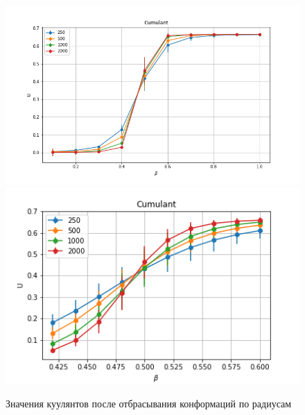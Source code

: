 \begin{figure}[h]
	\centering
	\includegraphics[width=1\textwidth]{../images/Cumulant_big.png} 
	\includegraphics[width=1\textwidth]{../images/Cumulant_beta0.4_0.6.png} 
	\caption{Значения куулянтов после отбрасывания конформаций по радиусам}
\end{figure}
